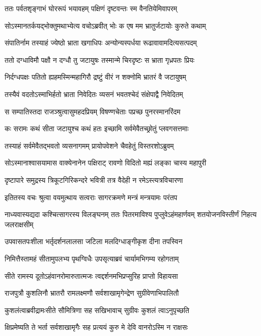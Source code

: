 \twolineshloka
{ततः पर्वतशृङ्गाभं घोररूपं भयावहम्}
{पक्षिणं दृष्टवन्तः स्म वैनतियेमिवापरम्}


\twolineshloka
{सोऽस्मानतर्कयद्भोक्तुमथाभ्येत्य वचोऽब्रवीत्}
{भोः क एष मम भ्रातुर्जटायोः कुरुते कथाम्}


\twolineshloka
{संपातिर्नाम तस्याहं ज्येष्ठो भ्राता खगाधिपः}
{अन्योन्यस्पर्धया रूढावावामदित्यसत्पदम्}


\twolineshloka
{ततो दग्धाविमौ पक्षौ न दग्धौ तु जटायुषः}
{तस्मान्मे चिरदृष्टः स भ्राता गृध्रपतः प्रियः}


\twolineshloka
{निर्दग्धपक्षः पतितो ह्यहमस्मिन्महागिरौ}
{द्रष्टुं वीरं न शक्नोमि भ्रातरं वै जटायुषम्}


\twolineshloka
{तस्यैवं वदतोऽस्माभिर्हतो भ्राता निवेदितः}
{व्यसनं भवतश्चेदं संक्षेपाद्वै निवेदितम्}


\twolineshloka
{स सम्पातिस्तदा राजञ्श्रुत्वासुमहदप्रियम्}
{विषण्णचेताः पप्रच्छ पुनरस्मानरिंदम}


\twolineshloka
{कः सरामः कथं सीता जटायुश्च कथं हतः}
{इच्छामि सर्वमेवैतच्छ्रोतुं प्लवगसत्तमाः}


\twolineshloka
{तस्याहं सर्वमेवैतद्भवतो व्यसनागमम्}
{प्रायोपवेशने चैवहेतुं विस्तरशोऽब्रुवम्}


\twolineshloka
{सोऽस्मानाश्वासयामास वाक्येनानेन पक्षिराट्}
{रावणो विदितो मह्यं लङ्का चास्य महापुरी}


\twolineshloka
{दृष्टापारे समुद्रस्य त्रिकूटगिरिकन्दरे}
{भवित्री तत्र वैदेही न रमेऽस्त्यत्रविचारणा}


\twolineshloka
{इतितस्य वचः श्रुत्वा वयमुत्थाय सत्वराः}
{सागरक्रमणे मन्त्रं मन्त्रयामः परंतप}


\threelineshloka
{नाध्यवास्यद्यदा कश्चित्सागरस्य विलङ्घनम्}
{ततः पितरमाविश्य पुप्लुवेऽहंमहार्णवम्}
{शतयोजनविस्तीर्णं निहत्य जलराक्षसीम्}


\twolineshloka
{उपवासतपःशीला भर्तृदर्शनलालसा}
{जटिला मलदिग्धाङ्गीकृश दीना तपस्विन}


\twolineshloka
{निमित्तैस्तामहं सीतामुपलभ्य पृथग्विधैः}
{उपसृत्याब्रवं चार्यामभिगम्य रहोगताम्}


\twolineshloka
{सीते रामस्य दूतोऽहंवानरोमारुतात्मजः}
{त्वद्दर्शनमभिप्रप्सुरिह प्राप्तो विहायसा}


\twolineshloka
{राजपुत्रौ कुशलिनौ भ्रातरौ रामलक्ष्मणौ}
{सर्वशाखामृगेन्द्रेण सुग्रीवेणाभिपालितौ}


\twolineshloka
{कुशलंत्वाब्रवीद्रामःसीते सौमित्रिणा सह}
{सखिभावाच् सुग्रीवः कुशलं त्वाऽनुपृच्छति}


\twolineshloka
{क्षिप्रमेष्यति ते भर्ता सर्वशाखामृगैः सह}
{प्रत्ययं कुरु मे देवि वानरोऽस्मि न राक्षसः}


